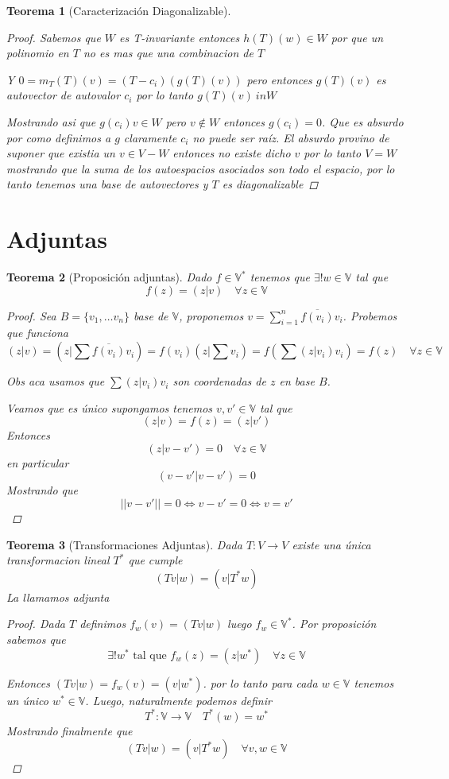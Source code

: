 \documentclass{article}
\theoremstyle{break}
\newtheorem{theorem}{Teorema}[section]
\begin{document}
\begin{theorem}[Caracterización Diagonalizable]
\begin{proof}
    Sabemos que $W$ es T-invariante entonces $h(T)(w) \in W$ por que un polinomio en $T$ no es mas que una combinacion de $T$

    Y $0 = m_T(T)(v) = (T-c_i)(g(T)(v))$ pero entonces $g(T)(v)$ es autovector de autovalor $c_i$ por lo tanto $g(T)(v) \ in W$

    Mostrando asi que $g(c_i)v \in W$ pero $v \notin W$ entonces $g(c_i) = 0$. Que es absurdo por como definimos a $g$ claramente $c_i$
    no puede ser raíz. El absurdo provino de suponer que existia un $v\in V - W$ entonces no existe dicho $v$ por lo tanto $V = W$ 
    mostrando que la suma de los autoespacios asociados son todo el espacio, por lo tanto tenemos una base de autovectores y $T$
    es diagonalizable
  \end{proof}
\end{theorem}

\section{Adjuntas}
\begin{theorem}[Proposición adjuntas]
  Dado $f \in \mathbb{V}^*$ tenemos que $\exists ! w \in \mathbb{V}$ tal que $$f(z) = (z|v) \quad \forall z \in \mathbb{V}$$
  \begin{proof}
    Sea $B = \{v_1,\ldots v_n\} $ base de $\mathbb{V}$, proponemos $v = \sum_{i=1}^n \overline{f(v_i)}v_i$. Probemos que funciona
    $$ (z|v) = (z|\sum \overline{f(v_i)}v_i) = f(v_i)(z|\sum v_i)  = f(\sum(z| v_i)v_i) = f(z) \quad \forall z\in\mathbb{V}$$

    Obs aca usamos que $\sum (z|v_i)v_i$ son coordenadas de $z$ en base $B$.

    Veamos que es único supongamos tenemos $v,v' \in \mathbb{V}$ tal que $$(z|v) = f(z) = (z|v')$$
    Entonces $$(z|v-v') = 0 \quad \forall z \in \mathbb{V}$$ en particular $$(v-v'|v-v')=0$$
    Mostrando que $$|| v-v'|| = 0 \iff v-v' = 0 \iff v = v'$$
  \end{proof}
  
\end{theorem}

\begin{theorem}[Transformaciones Adjuntas]
  Dada $T:V \rightarrow V$ existe una única transformacion lineal $T^*$ que cumple $$(Tv|w) = (v|T^*w)$$ La llamamos adjunta
  \begin{proof}
    Dada $T$ definimos $f_w(v) = (Tv|w)$ luego  $f_w\in \mathbb{V}^*$. Por proposición sabemos que 
    $$\exists ! w^* \text{ tal que } f_w(z) = (z|w^*) \quad \forall z \in \mathbb{V}$$

    Entonces $(Tv|w) = f_w(v) = (v|w^*)$. por lo tanto para cada $w\in \mathbb{V}$ tenemos un único $w^* \in \mathbb{V}$. Luego,
    naturalmente podemos definir 
    $$T^* :\mathbb{V} \rightarrow \mathbb{V} \quad T^*(w) = w^*$$
    Mostrando finalmente que $$(Tv|w) = (v|T^*w) \quad \forall v,w \in \mathbb{V}$$
  \end{proof}
\end{theorem}
\end{document}
